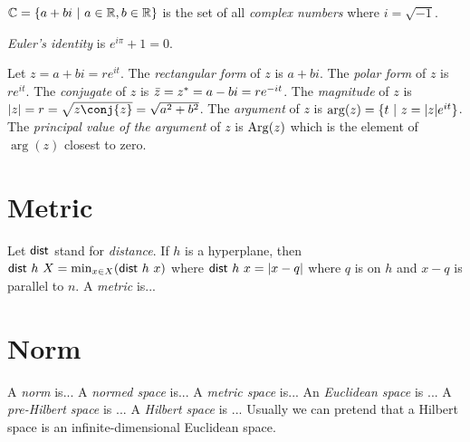 \(\mathbb{C} = \{ a + bi ~|~ a \in \mathbb{R}, b \in \mathbb{R} \}\)
is the set of all \emph{complex numbers} where \(i = \sqrt{-1}\).

%
\emph{Euler's identity} is \( e^{i \pi} + 1 = 0 \).

Let \(z = a+bi = re^{it}\).
%
%
The \emph{rectangular form} of \(z\) is \(a+bi\).
%
%
The \emph{polar form} of \(z\) is \(re^{it}\).
%
%
%
The \emph{conjugate} of \(z\) is \(\bar{z} = z^* = a-bi = re^{-it}\).
%
%
%
The \emph{magnitude} of \(z\) is \(\abs{z} = r = \sqrt{z\conj{z}} = \sqrt{a^2+b^2}\).
%
%
%
The \emph{argument} of \(z\) is \(\arg(z) = \{ t ~|~ z = |z| e^{it} \}\).
%
%
%
The \emph{principal value of the argument} of \(z\) is \(\mathrm{Arg}(z)\)
which is the element of \(\arg(z)\) closest to zero.

\section{Metric}

%
%
Let \(\textsf{dist}\) stand for \emph{distance}.
If \(h\) is a hyperplane,
then \(\textsf{dist}~h~X = \min_{x \in X} (\textsf{dist}~h~x)\)
where \(\textsf{dist}~h~x = |x-q|\) where \(q\) is on \(h\) and \(x-q\) is parallel to \(n\).
%
A \emph{metric} is...

\section{Norm}

%
A \emph{norm} is...
%
%
A \emph{normed space} is...
%
%
A \emph{metric space} is...
%
%
An \emph{Euclidean space} is ...
%
%
A \emph{pre-Hilbert space} is ...
%
%
A \emph{Hilbert space} is ...
Usually we can pretend that a Hilbert space is an infinite-dimensional Euclidean space.

